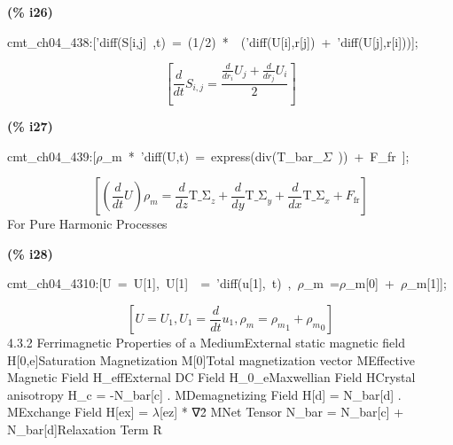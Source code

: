 \documentclass[fleqn]{article}
\begin{document}
\noindent
\begin{minipage}[t]{4.000000em}\color{red}\bfseries
(\% i26)	
\end{minipage}
\begin{minipage}[t]{\textwidth}\color{blue}
cmt\_ch04\_438:['diff(S[i,j]\ ,t)\ =\ (1/2)\ *\ \ ('diff(U[i],r[j])\ +\ 'diff(U[j],r[i]))];
\end{minipage}
\[\displaystyle \tag{\% o26} 
\left[ \frac{d}{d t} {S_{i,j}}=\frac{\frac{d}{d {r_i}} {U_j}+\frac{d}{d {r_j}} {U_i}}{2}\right] \mbox{}
\]


\noindent
\begin{minipage}[t]{4.000000em}\color{red}\bfseries
(\% i27)	
\end{minipage}
\begin{minipage}[t]{\textwidth}\color{blue}
cmt\_ch04\_439:[\ensuremath{\rho}\_m\ *\ 'diff(U,t)\ =\ express(div(T\_bar\_\ensuremath{\Sigma}\ ))\ +\ F\_fr\ ];
\end{minipage}
\[\displaystyle \tag{\% o27} 
\left[ \left( \frac{d}{d t} U\right)  {{\rho }_m}=\frac{d}{d z} {{\ensuremath{\mathrm{T\_ \Sigma }}}_z}+\frac{d}{d y} {{\ensuremath{\mathrm{T\_ \Sigma }}}_y}+\frac{d}{d x} {{\ensuremath{\mathrm{T\_ \Sigma }}}_x}+{F_{\ensuremath{\mathrm{fr}}}}\right] \mbox{}
\]
For Pure Harmonic Processes


\noindent
\begin{minipage}[t]{4.000000em}\color{red}\bfseries
(\% i28)	
\end{minipage}
\begin{minipage}[t]{\textwidth}\color{blue}
cmt\_ch04\_4310:[U\ =\ U[1],\ U[1]\ \ =\ 'diff(u[1],\ t)\ ,\ \ensuremath{\rho}\_m\ =\ensuremath{\rho}\_m[0]\ +\ \ensuremath{\rho}\_m[1]];
\end{minipage}
\[\displaystyle \tag{\% o28} 
\left[ U={U_1}\operatorname{,}{U_1}=\frac{d}{d t} {u_1}\operatorname{,}{{\rho }_m}={{{{\rho }_m}}_1}+{{{{\rho }_m}}_0}\right] \mbox{}
\]
4.3.2 Ferrimagnetic Properties of a MediumExternal static magnetic field H[0,e]Saturation Magnetization            M[0]Total magnetization vector          MEffective Magnetic Field              H\_effExternal DC Field                        H\_0\_eMaxwellian Field                         HCrystal anisotropy                       H\_c = -N\_bar[c] . MDemagnetizing Field                   H[d] = N\_bar[d]  . MExchange Field                           H[ex] = \ensuremath{\lambda}[ez] * ∇\^ 2 MNet Tensor                                 N\_bar = N\_bar[c] + N\_bar[d]Relaxation Term                         R
\end{document}
